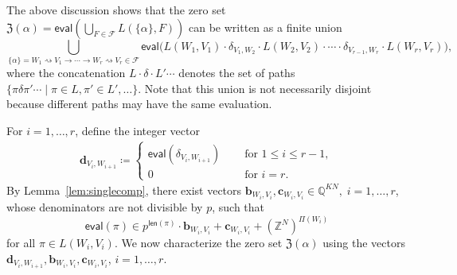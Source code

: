 \documentclass[letterpaper, 11pt, thm-restate]{article}
\numberwithin{equation}{section}
\newcommand{\Z}{\mathbb{Z}}
\newcommand{\Q}{\mathbb{Q}}
\newcommand{\mF}{\mathcal{F}}
\newcommand{\mZ}{\mathfrak{Z}}
\newcommand{\bb}{\boldsymbol{b}}
\newcommand{\bc}{\boldsymbol{c}}
\newcommand{\bd}{\boldsymbol{d}}
\newcommand{\len}{\mathsf{len}}
\newcommand{\eval}{\mathsf{eval}}
\theoremstyle{definition}
\theoremstyle{definition}
\theoremstyle{definition}
\begin{document}
The above discussion shows that the zero set $\mZ(\alpha) = \eval\left(\bigcup_{F \in \mF} L(\{\alpha\}, F)\right)$ can be written as a finite union
\begin{equation}\label{eq:decomppath}
\bigcup_{\{\alpha\} = W_1 \rightsquigarrow V_1 \rightarrow \cdots \rightarrow W_r \rightsquigarrow V_r \in \mF} \eval\Big(L(W_1, V_1) \cdot \delta_{V_1, W_2} \cdot L(W_2, V_2) \cdot \cdots \cdot \delta_{V_{r-1}, W_r} \cdot L(W_r, V_r)\Big),
\end{equation}
where the concatenation $L \cdot \delta \cdot L' \cdots$ denotes the set of paths $\{\pi \delta \pi' \cdots \mid \pi \in L, \pi' \in L', \ldots\}$.
Note that this union is not necessarily disjoint because different paths may have the same evaluation.

For $i = 1, \ldots, r$, define the integer vector
\begin{align*}
\bd_{V_i, W_{i+1}} \coloneqq 
\begin{cases}
    \eval(\delta_{V_i, W_{i+1}}) & \quad \text{ for } 1 \leq i \leq r-1, \\
    0 & \quad \text{ for } i = r.
\end{cases}
\end{align*}
By Lemma~\ref{lem:singlecomp}, there exist vectors $\bb_{W_i, V_i}, \bc_{W_i, V_i} \in \Q^{KN}, \; i = 1, \ldots, r$, whose denominators are not divisible by $p$, such that
\begin{equation}\label{eq:defcWV}
    \eval(\pi) \in p^{\len(\pi)} \cdot \bb_{W_i, V_i} + \bc_{W_i, V_i} +  (\Z^N)^{\Pi(W_i)}
\end{equation}
for all $\pi \in L(W_i, V_i)$.
We now characterize the zero set $\mZ(\alpha)$ using the vectors $\bd_{V_i, W_{i+1}}, \bb_{W_i, V_i}, \bc_{W_i, V_i}$, $i = 1, \ldots, r$.
\end{document}
